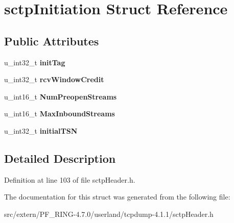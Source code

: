 \hypertarget{structsctp_initiation}{
\section{sctpInitiation Struct Reference}
\label{structsctp_initiation}
}
\subsection*{Public Attributes}
\begin{DoxyCompactItemize}
\item 
\hypertarget{structsctp_initiation_a37038b9050c7c2bcbb9536a2324dec63}{
u\_\-int32\_\-t {\bfseries initTag}}
\label{structsctp_initiation_a37038b9050c7c2bcbb9536a2324dec63}

\item 
\hypertarget{structsctp_initiation_ac6d4c63217492c13919d654b7e7ebd4a}{
u\_\-int32\_\-t {\bfseries rcvWindowCredit}}
\label{structsctp_initiation_ac6d4c63217492c13919d654b7e7ebd4a}

\item 
\hypertarget{structsctp_initiation_a4703da9b5ed1c54ffb88da258301d28d}{
u\_\-int16\_\-t {\bfseries NumPreopenStreams}}
\label{structsctp_initiation_a4703da9b5ed1c54ffb88da258301d28d}

\item 
\hypertarget{structsctp_initiation_a2646fcdb63d013064e94f7ea1f49372c}{
u\_\-int16\_\-t {\bfseries MaxInboundStreams}}
\label{structsctp_initiation_a2646fcdb63d013064e94f7ea1f49372c}

\item 
\hypertarget{structsctp_initiation_a0992732a662ac3278e8ec74bd8c1affe}{
u\_\-int32\_\-t {\bfseries initialTSN}}
\label{structsctp_initiation_a0992732a662ac3278e8ec74bd8c1affe}

\end{DoxyCompactItemize}


\subsection{Detailed Description}


Definition at line 103 of file sctpHeader.h.



The documentation for this struct was generated from the following file:\begin{DoxyCompactItemize}
\item 
src/extern/PF\_\-RING-\/4.7.0/userland/tcpdump-\/4.1.1/sctpHeader.h\end{DoxyCompactItemize}
